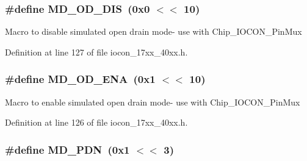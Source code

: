 \subsubsection[{\texorpdfstring{M\+D\+\_\+\+O\+D\+\_\+\+D\+IS}{MD_OD_DIS}}]{\setlength{\rightskip}{0pt plus 5cm}\#define M\+D\+\_\+\+O\+D\+\_\+\+D\+IS~(0x0 $<$$<$ 10)}\hypertarget{group__IOCON__17XX__40XX_ga1b2a7926f85c2e7fddf784ed9a692d33}{}\label{group__IOCON__17XX__40XX_ga1b2a7926f85c2e7fddf784ed9a692d33}
Macro to disable simulated open drain mode-\/ use with Chip\+\_\+\+I\+O\+C\+O\+N\+\_\+\+Pin\+Mux 

Definition at line 127 of file iocon\+\_\+17xx\+\_\+40xx.\+h.

\subsubsection[{\texorpdfstring{M\+D\+\_\+\+O\+D\+\_\+\+E\+NA}{MD_OD_ENA}}]{\setlength{\rightskip}{0pt plus 5cm}\#define M\+D\+\_\+\+O\+D\+\_\+\+E\+NA~(0x1 $<$$<$ 10)}\hypertarget{group__IOCON__17XX__40XX_ga83e1ce8c76aac6481562dd26b059ae61}{}\label{group__IOCON__17XX__40XX_ga83e1ce8c76aac6481562dd26b059ae61}
Macro to enable simulated open drain mode-\/ use with Chip\+\_\+\+I\+O\+C\+O\+N\+\_\+\+Pin\+Mux 

Definition at line 126 of file iocon\+\_\+17xx\+\_\+40xx.\+h.

\subsubsection[{\texorpdfstring{M\+D\+\_\+\+P\+DN}{MD_PDN}}]{\setlength{\rightskip}{0pt plus 5cm}\#define M\+D\+\_\+\+P\+DN~(0x1 $<$$<$ 3)}\hypertarget{group__IOCON__17XX__40XX_ga27ec0d2ed4901e435240b5e5d68211e7}{}\label{group__IOCON__17XX__40XX_ga27ec0d2ed4901e435240b5e5d68211e7}


